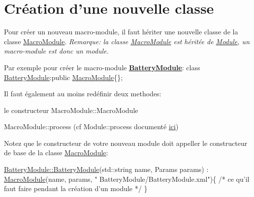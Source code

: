 \hypertarget{docModule_classCreation}{}\section{Création d'une nouvelle classe}\label{docModule_classCreation}
Pour créer un nouveau macro-\/module, il faut hériter une nouvelle classe de la classe \hyperlink{classMacroModule}{Macro\-Module}. {\itshape Remarque\-: la classe \hyperlink{classMacroModule}{Macro\-Module} est héritée de \hyperlink{classModule}{Module}, un macro-\/module est donc un module.}

Par exemple pour créer le macro-\/module {\bfseries \hyperlink{classBatteryModule}{Battery\-Module}}\-: {\ttfamily class \hyperlink{classBatteryModule}{Battery\-Module}\-:public \hyperlink{classMacroModule}{Macro\-Module}\{\};}

Il faut également au moins redéfinir deux methodes\-:
\begin{DoxyEnumerate}
\item le constructeur Macro\-Module\-::\-Macro\-Module
\item Macro\-Module\-::process (cf Module\-::process documenté \hyperlink{docModule}{ici})
\end{DoxyEnumerate}

Notez que le constructeur de votre nouveau module doit appeller le constructeur de base de la classe \hyperlink{classMacroModule}{Macro\-Module}\-:


\begin{DoxyCode}
\hyperlink{classBatteryModule_a2fb494ef5f124c38c0fdf9ccfb31918f}{BatteryModule::BatteryModule}(std::string name, 
      Params params) : \hyperlink{classMacroModule}{MacroModule}(name, params, \textcolor{stringliteral}{"
      BatteryModule/BatteryModule.xml"})\{
    \textcolor{comment}{/* ce qu'il faut faire pendant la création d'un module */}
\}
\end{DoxyCode}


